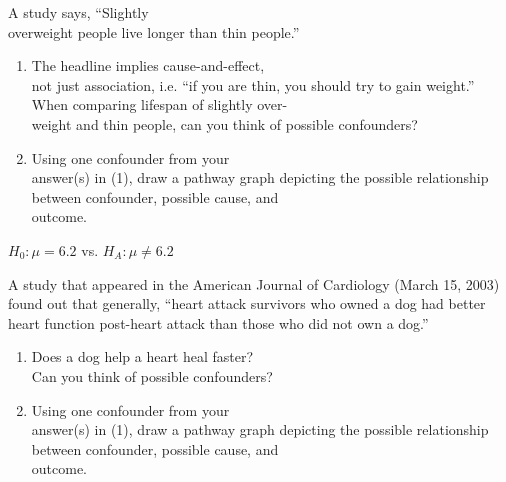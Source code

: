 \documentclass[11pt, chapterprefix=true]{scrbook}\usepackage[]{graphicx}\usepackage[]{color}
\begin{document}
\begin{exercises}
  \begin{exercise} %

A study says, ``Slightly \\ overweight people live longer than thin people.''

\begin{enumerate}
  \item The headline implies cause-and-effect, \\ not just association, i.e. ``if you are thin, you should try to gain weight.''  When comparing lifespan of slightly over- \\ weight and thin people, can you think of possible confounders?
  \item Using one confounder from your \\ answer(s) in (1), draw a pathway graph depicting the possible relationship between confounder, possible cause, and \\ outcome.
\end{enumerate}

	\end{exercise}
	\begin{solution}  %

	  $H_0: \mu = 6.2$ vs. $H_A: \mu \neq 6.2$
	\end{solution}

  \begin{exercise} %

A study that appeared in the American Journal of Cardiology (March 15, 2003) found out that generally, ``heart attack survivors who owned a dog had better heart function post-heart attack than those who did not own a dog.''

\begin{enumerate}
  \item Does a dog help a heart heal faster?  \\ Can you think of possible confounders?
  \item Using one confounder from your \\ answer(s) in (1), draw a pathway graph depicting the possible relationship between confounder, possible cause, and \\ outcome.
\end{enumerate}

	\end{exercise}


\end{exercises}
\end{document}
